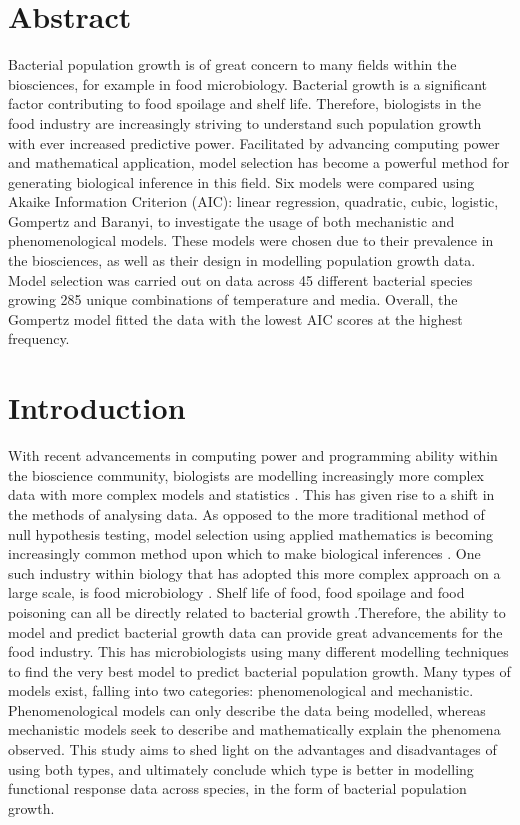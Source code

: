 \documentclass[11pt, a4paper]{article} %
\begin{document}
\linenumbers %
\linespread{2} %

\section{Abstract}

Bacterial population growth is of great concern to many fields within the biosciences, for example in food microbiology. Bacterial growth is a significant factor contributing to food spoilage and shelf life. Therefore, biologists in the food industry are increasingly striving to understand such population growth with ever increased predictive power. Facilitated by advancing computing power and mathematical application, model selection has become a powerful method for generating biological inference in this field. Six models were compared using Akaike Information Criterion (AIC): linear regression, quadratic, cubic, logistic, Gompertz and Baranyi, to investigate the usage of both mechanistic and phenomenological models. These models were chosen due to their prevalence in the biosciences, as well as their design in modelling population growth data. Model selection was carried out on data across 45 different bacterial species growing 285 unique combinations of temperature and media. Overall, the Gompertz model fitted the data with the lowest AIC scores at the highest frequency.

\section{Introduction}

With recent advancements in computing power and programming ability within the bioscience community, biologists are modelling increasingly more complex data with more complex models and statistics \citep{RN69, RN107}. This has given rise to a shift in the methods of analysing data. As opposed to the more traditional method of null hypothesis testing, model selection using applied mathematics is becoming increasingly common method upon which to make biological inferences \citep{RN68}. One such industry within biology that has adopted this more complex approach on a large scale, is food microbiology \citep{RN108, RN105}. Shelf life of food, food spoilage and food poisoning can all be directly related to bacterial growth \citep{RN106}.Therefore, the ability to model and predict bacterial growth data can provide great advancements for the food industry. This has microbiologists using many different modelling techniques to find the very best model to predict bacterial population growth. Many types of models exist, falling into two categories: phenomenological and mechanistic. Phenomenological models can only describe the data being modelled, whereas mechanistic models seek to describe and mathematically explain the phenomena observed. This study aims to shed light on the advantages and disadvantages of using both types, and ultimately conclude which type is better in modelling functional response data across species, in the form of bacterial population growth.
\end{document}
